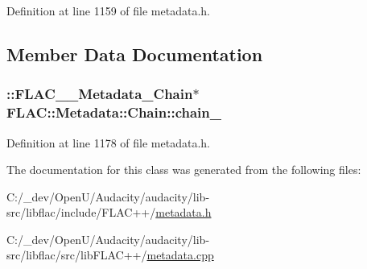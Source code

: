 Definition at line 1159 of file metadata.\+h.



\subsection{Member Data Documentation}
\subsubsection[{\texorpdfstring{chain\+\_\+}{chain_}}]{\setlength{\rightskip}{0pt plus 5cm}\+::{\bf F\+L\+A\+C\+\_\+\+\_\+\+Metadata\+\_\+\+Chain}$\ast$ F\+L\+A\+C\+::\+Metadata\+::\+Chain\+::chain\+\_\+\hspace{0.3cm}{\ttfamily [protected]}}\hypertarget{class_f_l_a_c_1_1_metadata_1_1_chain_a0cf0a7dd2b2f026477833b9c9193e746}{}\label{class_f_l_a_c_1_1_metadata_1_1_chain_a0cf0a7dd2b2f026477833b9c9193e746}


Definition at line 1178 of file metadata.\+h.



The documentation for this class was generated from the following files\+:\begin{DoxyCompactItemize}
\item 
C\+:/\+\_\+dev/\+Open\+U/\+Audacity/audacity/lib-\/src/libflac/include/\+F\+L\+A\+C++/\hyperlink{include_2_f_l_a_c_09_09_2metadata_8h}{metadata.\+h}\item 
C\+:/\+\_\+dev/\+Open\+U/\+Audacity/audacity/lib-\/src/libflac/src/lib\+F\+L\+A\+C++/\hyperlink{lib_f_l_a_c_09_09_2metadata_8cpp}{metadata.\+cpp}\end{DoxyCompactItemize}
